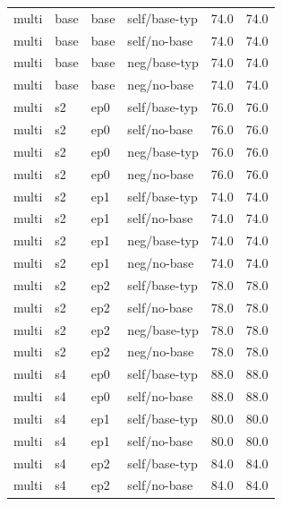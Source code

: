 {\begin{longtable}{llll rr}
\midrule
multi & base & base & self/base-typ & 74.0 & 74.0 \\
multi & base & base & self/no-base & 74.0 & 74.0 \\
multi & base & base & neg/base-typ & 74.0 & 74.0 \\
multi & base & base & neg/no-base & 74.0 & 74.0 \\
multi & s2 & ep0 & self/base-typ & 76.0 & 76.0 \\
multi & s2 & ep0 & self/no-base & 76.0 & 76.0 \\
multi & s2 & ep0 & neg/base-typ & 76.0 & 76.0 \\
multi & s2 & ep0 & neg/no-base & 76.0 & 76.0 \\
multi & s2 & ep1 & self/base-typ & 74.0 & 74.0 \\
multi & s2 & ep1 & self/no-base & 74.0 & 74.0 \\
multi & s2 & ep1 & neg/base-typ & 74.0 & 74.0 \\
multi & s2 & ep1 & neg/no-base & 74.0 & 74.0 \\
multi & s2 & ep2 & self/base-typ & 78.0 & 78.0 \\
multi & s2 & ep2 & self/no-base & 78.0 & 78.0 \\
multi & s2 & ep2 & neg/base-typ & 78.0 & 78.0 \\
multi & s2 & ep2 & neg/no-base & 78.0 & 78.0 \\
multi & s4 & ep0 & self/base-typ & 88.0 & 88.0 \\
multi & s4 & ep0 & self/no-base & 88.0 & 88.0 \\
multi & s4 & ep1 & self/base-typ & 80.0 & 80.0 \\
multi & s4 & ep1 & self/no-base & 80.0 & 80.0 \\
multi & s4 & ep2 & self/base-typ & 84.0 & 84.0 \\
multi & s4 & ep2 & self/no-base & 84.0 & 84.0 \\
\bottomrule
\end{longtable}
}
